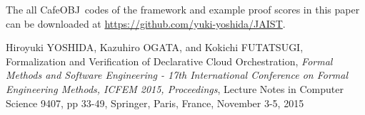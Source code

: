 \documentclass[12pt]{report}
\newcommand{\cafeobj}{{\sf CafeOBJ}~}
\begin{document}
The all \cafeobj codes of the framework and example proof scores in this paper
can be downloaded at \url{https://github.com/yuki-yoshida/JAIST}.

\appendix




\begin{publication}

\item
Hiroyuki YOSHIDA, Kazuhiro OGATA, and Kokichi FUTATSUGI,
Formalization and Verification of Declarative Cloud Orchestration,
\emph{Formal Methods and Software Engineering - 17th International Conference
               on Formal Engineering Methods, {ICFEM} 2015, Proceedings}, 
Lecture Notes in Computer Science 9407,
pp 33-49, 
Springer,
Paris, France,
November 3-5, 2015

\end{publication}
\end{document}

